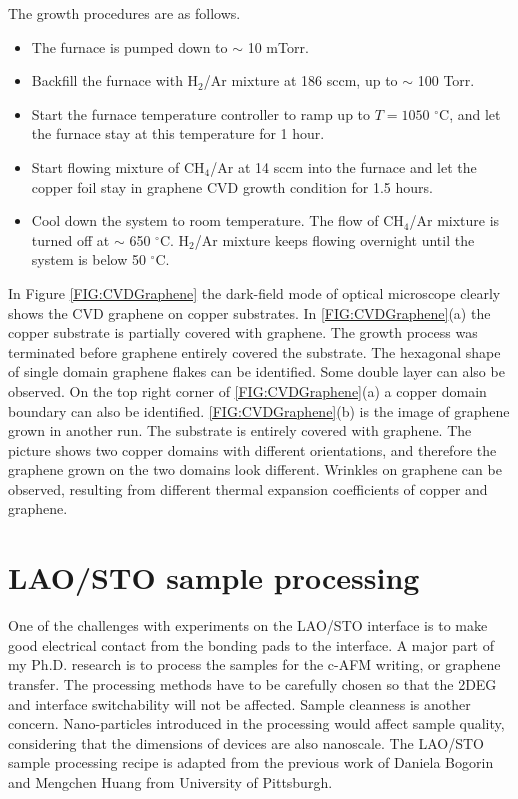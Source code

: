 \documentclass[pdflatex, sectionletters, 12pt]{pittetd}    %
\begin{document}
The growth procedures are as follows\cite{dhingra2015quadratic}. 

\begin{itemize}
	\item The furnace is pumped down to $\sim$ 10 mTorr.
	\item Backfill the furnace with H$_2$/Ar mixture at 186 sccm, up to $\sim$ 100 Torr.
	\item Start the furnace temperature controller to ramp up to $T = 1050$ $^{\circ}$C, and let the furnace stay at this temperature for 1 hour.
	\item Start flowing mixture of CH$_4$/Ar at 14 sccm into the furnace and let the copper foil stay in graphene CVD growth condition for 1.5 hours.
	\item Cool down the system to room temperature. The flow of CH$_4$/Ar mixture is turned off at $\sim$ 650 $^{\circ}$C. H$_2$/Ar mixture keeps flowing overnight until the system is below 50 $^{\circ}$C. 
	
\end{itemize}

In Figure \ref{FIG:CVDGraphene} the dark-field mode of optical microscope clearly shows the CVD graphene on copper substrates. In \ref{FIG:CVDGraphene}(a) the copper substrate is partially covered with graphene. The growth process was terminated before graphene entirely covered the substrate. The hexagonal shape of single domain graphene flakes can be identified. Some double layer can also be observed. On the top right corner of \ref{FIG:CVDGraphene}(a) a copper domain boundary can also be identified. \ref{FIG:CVDGraphene}(b) is the image of graphene grown in another run. The substrate is entirely covered with graphene. The picture shows two copper domains with different orientations, and therefore the graphene grown on the two domains look different. Wrinkles on graphene can be observed, resulting from different thermal expansion coefficients of copper and graphene. 

\section{LAO/STO sample processing}

One of the challenges with experiments on the LAO/STO interface is to make good electrical contact from the bonding pads to the interface. A major part of my Ph.D. research is to process the samples for the c-AFM writing, or graphene transfer. The processing methods have to be carefully chosen so that the 2DEG and interface switchability will not be affected. Sample cleanness is another concern. Nano-particles introduced in the processing would affect sample quality, considering that the dimensions of devices are also nanoscale. The LAO/STO sample processing recipe is adapted from the previous work of Daniela Bogorin and Mengchen Huang from University of Pittsburgh.
\end{document}
